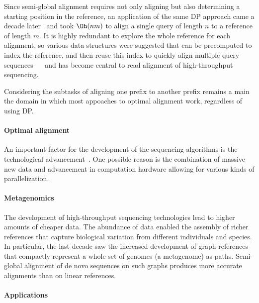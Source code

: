Since semi-global alignment requires not only aligning but also determining a
starting position in the reference, an application of the same DP approach came
a decade later~\cite{sellers1980theory,smith1981identification} and took
$\Oh(nm)$ to align a single query of length $n$ to a reference of length $m$. It
is highly redundant to explore the whole reference for each alignment, so
various data structures were suggested that can be precomputed to index the
reference, and then reuse this index to quickly align multiple query sequences
~\citeyear{pearson1988improved}~\cite{pearson1988improved} and has become
central to read alignment of high-throughput sequencing.

Considering the subtasks of aligning one prefix to another prefix remains a main
the domain in which most appoaches to optimal alignment work, regardless of
using DP.

\paragraph{Optimal alignment}

An important factor for the development of the sequencing algorithms is the
technological advancement~\cite{alser2021technology}. One possible reason is the
combination of massive new data and advancement in computation hardware allowing
for various kinds of parallelization.

\paragraph{Metagenomics}
The development of high-throughput sequencing technologies lead to higher
amounts of cheaper data. The abundance of data enabled the assembly of richer
references that capture biological variation from different individuals and
species. In particular, the last decade saw the increased development of graph
references that compactly represent a whole set of genomes (a metagenome) as
paths. Semi-global alignment of de novo sequences on such graphs produces more
accurate alignments than on linear references.

\paragraph{Applications}


